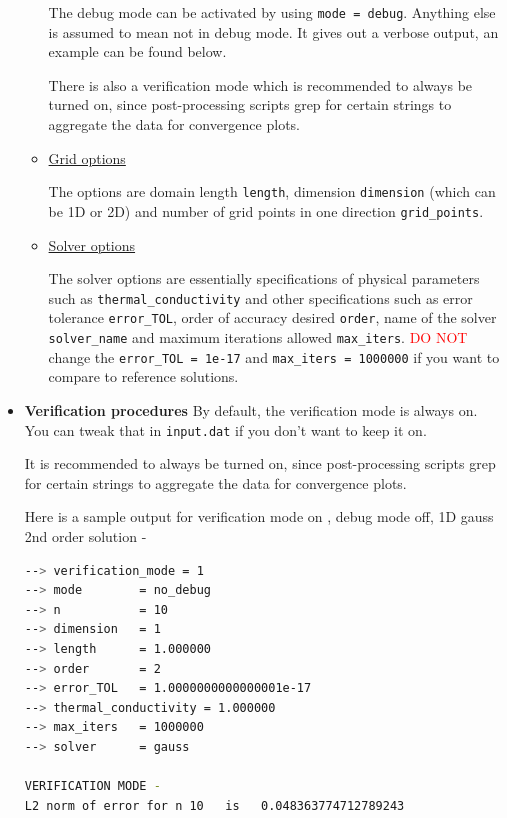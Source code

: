 \documentclass[12 pt, final]{article}
\begin{document}
\begin{itemize}
\begin{itemize}
        The debug mode can be activated by using \texttt{mode = debug}. Anything else is assumed to mean not in debug mode. It gives out a verbose output, an example can be found below.
        
        There is also a verification mode which is recommended to always be turned on, since post-processing scripts grep for certain strings to aggregate the data for convergence plots. 
        \item \underline{Grid options}
        
        The options are domain length \texttt{length}, dimension \texttt{dimension} (which can be 1D or 2D) and number of grid points in one direction \texttt{grid\_points}. 
        \item \underline{Solver options}
        
        The solver options are essentially specifications of physical parameters such as \texttt{thermal\_conductivity} and other specifications such as error tolerance \texttt{error\_TOL}, order of accuracy desired \texttt{order}, name of the solver \texttt{solver\_name} and maximum iterations allowed \texttt{max\_iters}. \textcolor{red}{DO NOT} change the \texttt{error\_TOL = 1e-17} and \texttt{max\_iters = 1000000} if you want to compare to reference solutions.
    \end{itemize}
    \item \textbf{Verification procedures}
    By default, the verification mode is always on. You can tweak that in \texttt{input.dat} if you don't want to keep it on.
    
    It is recommended to always be turned on, since post-processing scripts grep for certain strings to aggregate the data for convergence plots.
    
    Here is a sample output for verification mode on , debug mode off, 1D gauss 2nd order solution -
    \begin{lstlisting}[language = bash, basicstyle=\tiny]
--> verification_mode = 1
--> mode        = no_debug
--> n           = 10
--> dimension   = 1
--> length      = 1.000000
--> order       = 2
--> error_TOL   = 1.0000000000000001e-17
--> thermal_conductivity = 1.000000
--> max_iters   = 1000000
--> solver      = gauss

VERIFICATION MODE -
L2 norm of error for n 10   is   0.048363774712789243


\end{lstlisting}
\end{itemize}
\end{document}
